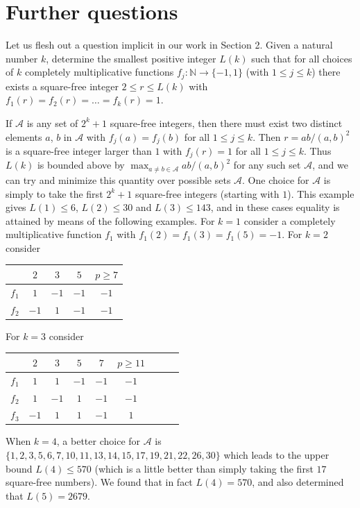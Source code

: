 \documentclass[11pt,makeidx, reqno]{amsart}
\theoremstyle{mystyle}
\theoremstyle{definition}
\begin{document}
\section{Further questions}


Let us flesh out a question implicit in our work in Section 2.   Given a natural number $k$, determine the smallest positive integer $L(k)$ such that for all choices of $k$ completely multiplicative functions $f_j: {\mathbb N} \to \{-1, 1\}$ (with $1\le j\le k$) there exists a square-free integer $2\le r\le L(k)$ with $f_1(r)=f_2(r)=\ldots = f_k(r)=1$.  

If ${\mathcal A}$ is any set of $2^{k}+1$ square-free integers, then there must exist two distinct elements $a$, $b$ in ${\mathcal A}$ with $f_j(a)=f_j(b)$ for all $1\le j\le k$.   Then $r= ab/(a,b)^2$ is a square-free integer larger than $1$ with $f_j(r)=1$ for all $1\le j\le k$.   Thus $L(k)$ is bounded above by $\max_{a\neq b \in {\mathcal A}} ab/(a,b)^2$ for any such set ${\mathcal A}$, and we can try and minimize this quantity over possible sets ${\mathcal A}$.   One choice for ${\mathcal A}$ is simply to take the first $2^{k}+1$ square-free integers (starting with $1$).  This example gives $L(1)\le 6$, $L(2)\le 30$ and $L(3)\le 143$, and in these cases equality is attained by means of the following examples.  For $k=1$ consider a  completely multiplicative function $f_1$ with $f_1(2)=f_1(3)=f_1(5)=-1$.  For $k=2$ consider  
\begin{center}
\begin{tabular}{ |c|c|c|c|c| } 
\hline
  & $2$ & $3$ & $5$ & $p \ge 7$ \\ 
   \hline
 $f_1$ & $1$ & $-1$ & $-1$ & $-1$ \\ 
 $f_2$ & $-1$ & $1$ & $-1$ & $-1$ \\ 
 \hline
\end{tabular}
\end{center}
For $k=3$ consider 
\begin{center}
\begin{tabular}{ |c|c|c|c|c|c|c|c|c| } 
\hline
  & $2$ & $3$ & $5$ & $7$ & $p \ge 11$ \\ 
   \hline
 $f_1$ & $1$ & $1$ & $-1$ & $-1$ & $-1$\\ 
 $f_2$ & $1$ & $-1$ & $1$ & $-1$ & $-1$\\
 $f_3$ & $-1$ & $1$ & $1$ & $-1$ & $1$ \\
 \hline
\end{tabular}
\end{center}
When $k=4$, a better choice for ${\mathcal A}$ is $\{ 1, 2, 3, 5, 6, 7, 10, 11, 13, 14, 15, 17, 19, 21, 22, 26, 30\}$ which leads to the upper bound $L(4) \le 570$ (which is a little better than simply taking the first $17$ square-free numbers).    We found that in fact  $L(4)=570$, and also determined that $L(5)=2679$.   
\end{document}
